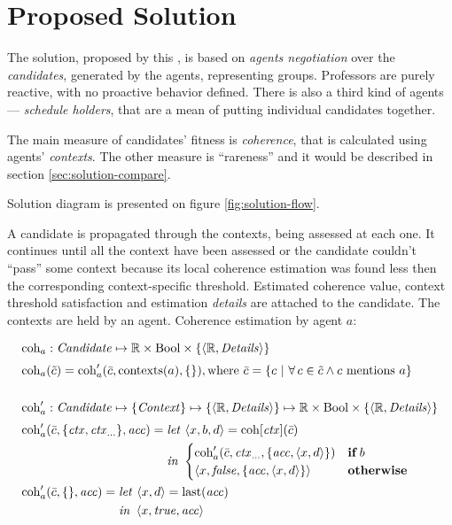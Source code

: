 \documentclass[ThesisDoc]{subfiles}
\begin{document}
\chapter{Proposed Solution}
\label{chapter:solution}


The solution, proposed by this \thisdoc, is based on \emph{agents negotiation}
over the \emph{candidates}, generated by the agents, representing groups.
Professors are purely reactive, with no proactive behavior defined.
There is also a third kind of agents --- \emph{schedule holders}, that are
a mean of putting individual candidates together.

The main measure of candidates' fitness is \emph{coherence}, that is calculated
using agents' \emph{contexts}. The other measure is ``rareness'' and it would be
described in section \ref{sec:solution-compare}.

Solution diagram is presented on figure \ref{fig:solution-flow}.







\medskip{}\medskip

\noindent
A candidate is propagated through the contexts, being assessed at each one.
It continues until all the context have been assessed or the candidate couldn't
``pass'' some context because its local coherence estimation was found less then
the corresponding context-specific threshold. Estimated coherence value,
context threshold satisfaction and estimation \emph{details}
are attached to the candidate. The contexts are held by an agent.
Coherence estimation by agent $a$:

\begin{align*}
  & \mathrm{coh}_a: \mathit{Candidate} \mapsto \mathbb{R} \times \mathrm{Bool} \times \{\left<\mathbb{R},\mathit{Details}\right>\}
  \\[.3em]
  & \mathrm{coh}_a(\tilde{c}) = \mathrm{coh}'_a(\bar{c}, \mathrm{contexts}(a), \{\}),
    \mathrm{where}~ \bar{c} = \{c ~|~ \forall\, c \in \tilde{c} \land
                                           c~ \mathrm{mentions}~ a \}
  \\\\
  & \mathrm{coh}'_a: \mathit{Candidate} \mapsto \{\mathit{Context}\}
             \mapsto \{\left<\mathbb{R},\mathit{Details}\right>\}
             \mapsto \mathbb{R} \times \mathrm{Bool} \times \{\left<\mathbb{R},\mathit{Details}\right>\}
  \\[.3em]
  & \mathrm{coh}'_a(\bar{c}, \{ \mathit{ctx}, \mathit{ctx}_{\dots} \}, \mathit{acc}) =
    \begin{aligned}[t] & \mathit{let}\, \left<x,b,d\right> = \mathrm{coh}[\mathit{ctx}](\bar{c}) \\& \mathit{in}~ \begin{cases}
          \mathrm{coh}'_a(\bar{c}, \mathit{ctx}_{\dots}, \{\mathit{acc}, \left<x,d\right>\}) & \mathbf{if}\, b \\
          \left<x,\mathit{false}, \{\mathit{acc}, \left<x,d\right>\}\right>          & \mathbf{otherwise}
        \end{cases} \end{aligned}\\
  & \mathrm{coh}'_a(\bar{c}, \{\}, \mathit{acc}) =
    \begin{aligned}[t] & \mathit{let}\,  \left<x,d\right> = \mathrm{last}(\mathit{acc}) \\& \mathit{in}~  \left<x,\mathit{true},\mathit{acc}\right>  \end{aligned}
\end{align*}
\end{document}

